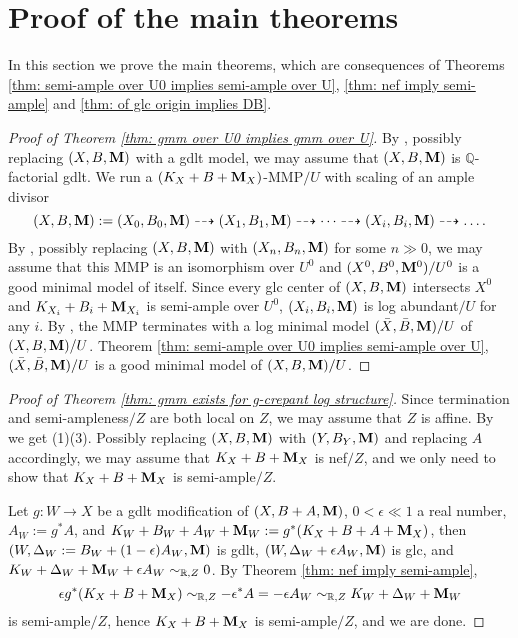 \documentclass[11pt]{amsart}
\numberwithin{equation}{section}
\newcommand{\Mm}{{\bf{M}}}
\theoremstyle{definition}
\theoremstyle{definition}
\theoremstyle{definition}
\begin{document}
\section{Proof of the main theorems}\label{sec: proof of the main theorems}

In this section we prove the main theorems, which are consequences of Theorems  \ref{thm: semi-ample over U0 implies semi-ample over U}, \ref{thm: nef imply semi-ample} and \ref{thm: of glc origin implies DB}.

\begin{proof}[Proof of Theorem \ref{thm: gmm over U0 implies gmm over U}]
By \cite[Theorem 3.14]{HL21a}, possibly replacing $(X,B,\Mm)$ with a gdlt model, we may assume that $(X,B,\Mm)$ is $\mathbb Q$-factorial gdlt. We run a $(K_X+B+\Mm_X)$-MMP$/U$ with scaling of an ample divisor
$$(X,B,\Mm):=(X_0,B_0,\Mm)\dashrightarrow (X_1,B_1,\Mm)\dashrightarrow\dots\dashrightarrow (X_i,B_i,\Mm)\dashrightarrow\dots.$$
By \cite[Lemma 2.7]{LX22}, possibly replacing $(X,B,\Mm)$ with $(X_n,B_n,\Mm)$ for some $n\gg 0$, we may assume that this MMP is an isomorphism over $U^0$ and $(X^0,B^0,\Mm^0)/U^0$ is a good minimal model of itself. Since every glc center of $(X,B,\Mm)$ intersects $X^0$ and $K_{X_i}+B_i+\Mm_{X_i}$ is semi-ample over $U^0$, $(X_i,B_i,\Mm)$ is log abundant$/U$ for any $i$. By \cite[Theorem 7.6]{LX22}, the MMP terminates with a log minimal model $(\bar X,\bar B,\Mm)/U$ of $(X,B,\Mm)/U$. Theorem \ref{thm: semi-ample over U0 implies semi-ample over U}, $(\bar X,\bar B,\Mm)/U$ is a good minimal model of $(X,B,\Mm)/U$.
\end{proof}


\begin{proof}[Proof of Theorem \ref{thm: gmm exists for g-crepant log structure}]
 Since termination and semi-ampleness$/Z$ are both local on $Z$, we may assume that $Z$ is affine. By \cite[Theorem 1.3]{LX22} we get (1)(3). Possibly replacing $(X,B,\Mm)$ with $(Y,B_Y,\Mm)$ and replacing $A$ accordingly, we may assume that $K_X+B+\Mm_X$ is nef$/Z$, and we only need to show that $K_X+B+\Mm_X$ is semi-ample$/Z$.

Let $g: W\rightarrow X$ be a gdlt modification of $(X,B+A,\Mm)$, $0<\epsilon\ll 1$ a real number, $A_W:=g^*A$, and $K_W+B_W+A_W+\Mm_W:=g^*(K_X+B+A+\Mm_X)$, then $(W,\Delta_W:=B_W+(1-\epsilon)A_W,\Mm)$ is gdlt, $(W,\Delta_W+\epsilon A_W,\Mm)$ is glc, and $K_W+\Delta_W+\Mm_W+\epsilon A_W\sim_{\mathbb R,Z}0$. By Theorem \ref{thm: nef imply semi-ample}, 
$$\epsilon g^*(K_X+B+\Mm_X)\sim_{\mathbb R,Z}-\epsilon^*A=-\epsilon A_W\sim_{\mathbb R,Z}K_W+\Delta_W+\Mm_W$$ 
is semi-ample$/Z$, hence $K_X+B+\Mm_X$ is semi-ample$/Z$, and we are done.
\end{proof}
\end{document}
